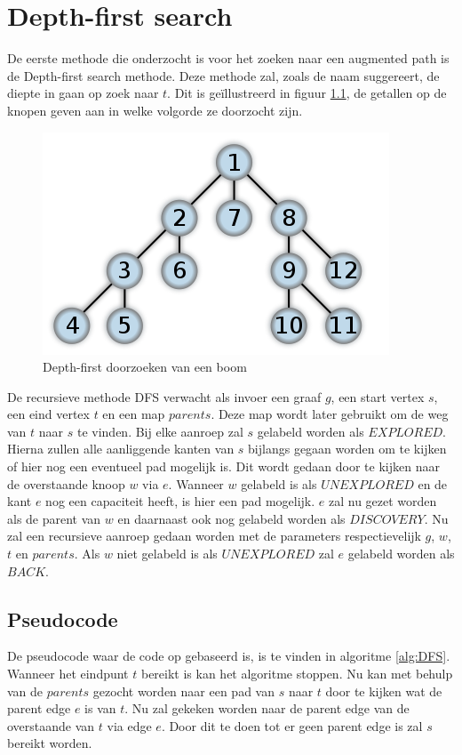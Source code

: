 \chapter{Depth-first search}
\label{chap:depthfirst}

De eerste methode die onderzocht is voor het zoeken naar een augmented path is de Depth-first search methode. Deze methode zal, zoals de naam suggereert, de diepte in gaan op zoek naar $t$. Dit is ge\"illustreerd in figuur \ref{fig:depthFirstTree}, de getallen op de knopen geven aan in welke volgorde ze doorzocht zijn.

\begin{figure}[h]
 \centering
 \includegraphics[width=0.5\linewidth]{depthfirst/depthfirsttree}
 \caption{Depth-first doorzoeken van een boom}
 \label{fig:depthFirstTree}
\end{figure}

De recursieve methode DFS verwacht als invoer een graaf $g$, een start vertex $s$, een eind vertex $t$ en een map $parents$. Deze map wordt later gebruikt om de weg van $t$ naar $s$ te vinden. Bij elke aanroep zal $s$ gelabeld worden als $EXPLORED$. Hierna zullen alle aanliggende kanten van $s$ bijlangs gegaan worden om te kijken of hier nog een eventueel pad mogelijk is. Dit wordt gedaan door te kijken naar de overstaande knoop $w$ via $e$. Wanneer $w$ gelabeld is als $UNEXPLORED$ en de kant $e$ nog een capaciteit heeft, is hier een pad mogelijk. $e$ zal nu gezet worden als de parent van $w$ en daarnaast ook nog gelabeld worden als $DISCOVERY$. Nu zal een recursieve aanroep gedaan worden met de parameters respectievelijk $g$, $w$, $t$ en $parents$.
Als $w$ niet gelabeld is als $UNEXPLORED$ zal $e$ gelabeld worden als $BACK$.

\section{Pseudocode}
De pseudocode waar de code op gebaseerd is, is te vinden in algoritme \ref{alg:DFS}.
Wanneer het eindpunt $t$ bereikt is kan het algoritme stoppen. Nu kan met behulp van de $parents$ gezocht worden naar een pad van $s$ naar $t$ door te kijken wat de parent edge $e$ is van $t$. Nu zal gekeken worden naar de parent edge van de overstaande van $t$ via edge $e$. Door dit te doen tot er geen parent edge is zal $s$ bereikt worden.

